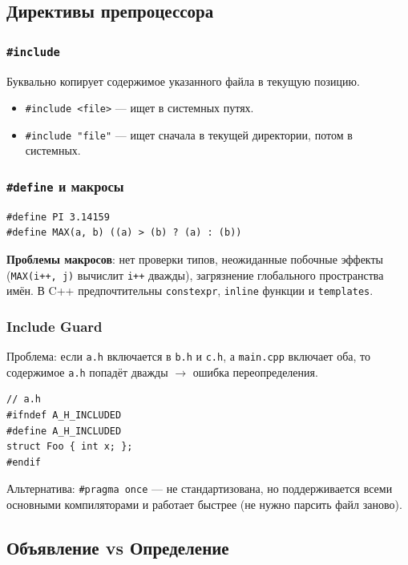 \documentclass[12pt,a4paper]{article}
\begin{document}
\subsection{Директивы препроцессора}

\subsubsection{\texttt{\#include}}
Буквально копирует содержимое указанного файла в текущую позицию.
\begin{itemize}
    \item \texttt{\#include <file>} --- ищет в системных путях.
    \item \texttt{\#include "file"} --- ищет сначала в текущей директории, потом в системных.
\end{itemize}

\subsubsection{\texttt{\#define} и макросы}
\begin{lstlisting}
#define PI 3.14159
#define MAX(a, b) ((a) > (b) ? (a) : (b))
\end{lstlisting}
\textbf{Проблемы макросов}: нет проверки типов, неожиданные побочные эффекты (\texttt{MAX(i++, j)} вычислит \texttt{i++} дважды), загрязнение глобального пространства имён. В C++ предпочтительны \texttt{constexpr}, \texttt{inline} функции и \texttt{templates}.

\subsubsection{Include Guard}
Проблема: если \texttt{a.h} включается в \texttt{b.h} и \texttt{c.h}, а \texttt{main.cpp} включает оба, то содержимое \texttt{a.h} попадёт дважды $\to$ ошибка переопределения.
\begin{lstlisting}
// a.h
#ifndef A_H_INCLUDED
#define A_H_INCLUDED
struct Foo { int x; };
#endif
\end{lstlisting}
Альтернатива: \texttt{\#pragma once} --- не стандартизована, но поддерживается всеми основными компиляторами и работает быстрее (не нужно парсить файл заново).

\subsection{Объявление vs Определение}
\end{document}
